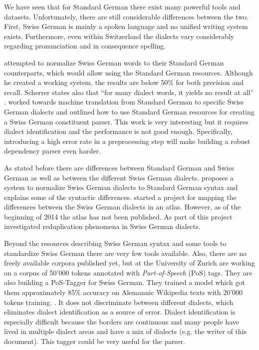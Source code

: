 \documentclass[11pt,letterpaper]{article}
\begin{document}
We have seen that for Standard German there exist many powerful tools and datasets. Unfortunately, there are still considerable differences between the two. First, Swiss German is mainly a spoken language and no unified writing system exists. Furthermore, even within Switzerland the dialects vary considerably regarding pronunciation and in consequence spelling. 

\citet{Scherrer07} attempted to normalize Swiss German words to their Standard German counterparts, which would allow using the Standard German resources. Although he created a working system, the results are below 50\% for both precision and recall. Scherrer states also that ``for many dialect words, it yields no result at all'' \citep[p. 60]{Scherrer07}. \citet{SR10} worked towards machine translation from Standard German to specific Swiss German dialects and outlined how to use Standard German resources for creating a Swiss German constituent parser. This work is very interesting but it requires dialect identification and the performance is not good enough. Specifically, introducing a high error rate in a preprocessing step will make building a robust dependency parser even harder. 

As stated before there are differences between Standard German and Swiss German as well as between the different Swiss German dialects. \citet{Scherrer11} proposes a system to normalize Swiss German dialects to Standard German syntax and explains some of the syntactic differences. \citet{BG02} started a project for mapping the differences between the Swiss German dialects in an atlas. However, as of the beginning of 2014 the atlas has not been published. As part of this project \citet{GF06} investigated reduplication phenomena in Swiss German dialects. 

Beyond the resources describing Swiss German syntax and some tools to standardize Swiss German there are very few tools available. Also, there are no freely available corpora published yet, but \citet{AH14} at the University of Zurich are working on a corpus of 50'000 tokens annotated with \emph{Part-of-Speech} (PoS) tags. They are also building a PoS-Tagger for Swiss German. They trained a model which got them approximately 85\% accuracy on Alemannic Wikipedia texts with 20'000 tokens training. \citep{AH12}. It does not discriminate between different dialects, which eliminates dialect identification as a source of error. Dialect identification is especially difficult because the borders are continuous and many people have lived in multiple dialect areas and have a mix of dialects (e.g. the writer of this document). This tagger could be very useful for the parser.
\end{document}
